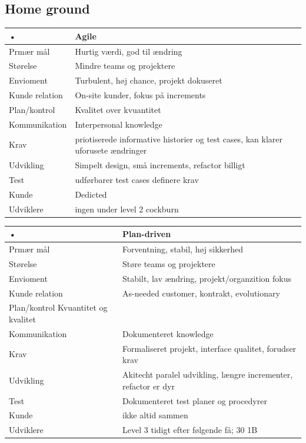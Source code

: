 \documentclass[11pt,a4paper]{article}
\begin{document}
\subsection{Home ground}
\begin{tabular}{|l|l|}
\hline 
• & Agile  \\ 
\hline 
Prmær mål & Hurtig værdi, god til ændring  \\ 
\hline 
Størelse & Mindre teams og projektere  \\ 
\hline 
Envioment & Turbulent, høj chance, projekt dokuseret  \\ 
\hline 
Kunde relation & On-site kunder, fokus på increments  \\ 
\hline 
Plan/kontrol & Kvalitet over kvuantitet  \\ 
\hline 
Kommunikation & Interpersonal knowledge  \\ 
\hline 
Krav & priotiserede informative historier og test cases, kan klarer uforusete ændringer  \\ 
\hline 
Udvikling & Simpelt design, små increments, refactor billigt  \\ 
\hline 
Test & udførbarer test cases definere krav  \\ 
\hline 
Kunde & Dedicted  \\ 
\hline 
Udviklere & ingen under level 2 cockburn  \\ 
\hline 
\end{tabular} 
\begin{tabular}{|l|l|}
\hline 
• & Plan-driven \\ 
\hline 
Prmær mål  & Forventning, stabil, høj sikkerhed \\ 
\hline 
Størelse  & Støre teams og projektere \\ 
\hline 
Envioment & Stabilt, lav ændring, projekt/organzition fokus \\ 
\hline 
Kunde relation & As-needed customer, kontrakt, evolutionary \\ 
\hline 
Plan/kontrol Kvuantitet og kvalitet \\ 
\hline 
Kommunikation & Dokumenteret knowledge \\ 
\hline 
Krav & Formaliseret projekt, interface qualitet, forudser krav \\ 
\hline 
Udvikling & Akitecht paralel udvikling, længre incrementer, refactor er dyr \\ 
\hline 
Test & Dokumenteret test planer og procedyrer \\ 
\hline 
Kunde & ikke altid sammen \\ 
\hline 
Udviklere & Level 3 tidigt efter følgende få; 30 1B \\ 
\hline 
\end{tabular} 
\end{document}
